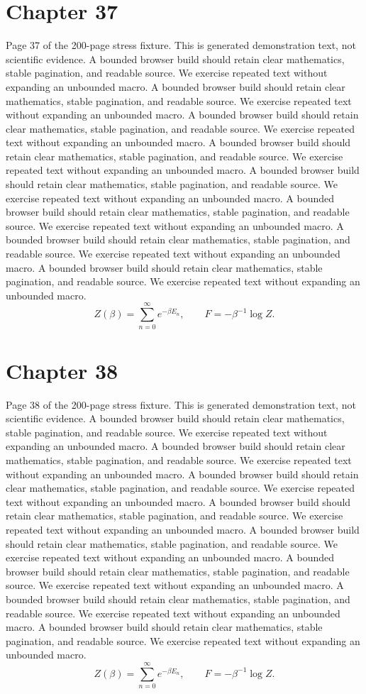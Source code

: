 \documentclass[11pt]{article}
\begin{document}
\section*{Chapter 37}
Page 37 of the 200-page stress fixture. This is generated demonstration text, not scientific evidence.
A bounded browser build should retain clear mathematics, stable pagination, and readable source. We exercise repeated text without expanding an unbounded macro.
A bounded browser build should retain clear mathematics, stable pagination, and readable source. We exercise repeated text without expanding an unbounded macro.
A bounded browser build should retain clear mathematics, stable pagination, and readable source. We exercise repeated text without expanding an unbounded macro.
A bounded browser build should retain clear mathematics, stable pagination, and readable source. We exercise repeated text without expanding an unbounded macro.
A bounded browser build should retain clear mathematics, stable pagination, and readable source. We exercise repeated text without expanding an unbounded macro.
A bounded browser build should retain clear mathematics, stable pagination, and readable source. We exercise repeated text without expanding an unbounded macro.
A bounded browser build should retain clear mathematics, stable pagination, and readable source. We exercise repeated text without expanding an unbounded macro.
A bounded browser build should retain clear mathematics, stable pagination, and readable source. We exercise repeated text without expanding an unbounded macro.
\[Z(\beta)=\sum_{n=0}^{\infty}e^{-\beta E_n},\qquad F=-\beta^{-1}\log Z.\]
\newpage
\section*{Chapter 38}
Page 38 of the 200-page stress fixture. This is generated demonstration text, not scientific evidence.
A bounded browser build should retain clear mathematics, stable pagination, and readable source. We exercise repeated text without expanding an unbounded macro.
A bounded browser build should retain clear mathematics, stable pagination, and readable source. We exercise repeated text without expanding an unbounded macro.
A bounded browser build should retain clear mathematics, stable pagination, and readable source. We exercise repeated text without expanding an unbounded macro.
A bounded browser build should retain clear mathematics, stable pagination, and readable source. We exercise repeated text without expanding an unbounded macro.
A bounded browser build should retain clear mathematics, stable pagination, and readable source. We exercise repeated text without expanding an unbounded macro.
A bounded browser build should retain clear mathematics, stable pagination, and readable source. We exercise repeated text without expanding an unbounded macro.
A bounded browser build should retain clear mathematics, stable pagination, and readable source. We exercise repeated text without expanding an unbounded macro.
A bounded browser build should retain clear mathematics, stable pagination, and readable source. We exercise repeated text without expanding an unbounded macro.
\[Z(\beta)=\sum_{n=0}^{\infty}e^{-\beta E_n},\qquad F=-\beta^{-1}\log Z.\]
\newpage
\end{document}
